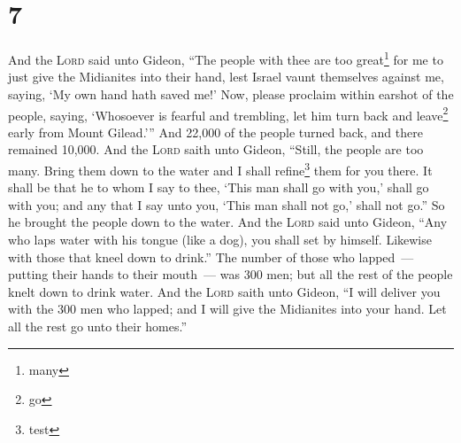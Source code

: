 \section{7}
\begin{enumerate}[align=center]
     And the \textsc{Lord} said unto Gideon, ``The people with thee are too great\footnote{many} for me to just give the Midianites into their hand, lest Israel vaunt themselves against me, saying, `My own hand hath saved me!'%
     Now, please proclaim within earshot of the people, saying, `Whosoever is fearful and trembling, let him turn back and leave\footnote{go} early from Mount Gilead.''' And 22,000 of the people turned back, and there remained 10,000.%
     And the \textsc{Lord} saith unto Gideon, ``Still, the people are too many. Bring them down to the water and I shall refine\footnote{test} them for you there. It shall be that he to whom I say to thee, `This man shall go with you,' shall go with you; and any that I say unto you, `This man shall not go,' shall not go.''%
     So he brought the people down to the water. And the \textsc{Lord} said unto Gideon, ``Any who laps water with his tongue (like a dog), you shall set by himself. Likewise with those that kneel down to drink.''%
     The number of those who lapped~--- putting their hands to their mouth~--- was 300 men; but all the rest of the people knelt down to drink water.%
     And the \textsc{Lord} saith unto Gideon, ``I will deliver you with the 300 men who lapped; and I will give the Midianites into your hand. Let all the rest go unto their homes.''%
\end{enumerate}
